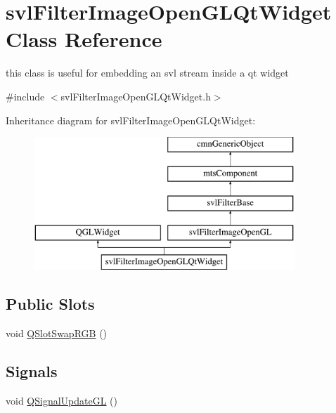 \hypertarget{classsvl_filter_image_open_g_l_qt_widget}{}\section{svl\+Filter\+Image\+Open\+G\+L\+Qt\+Widget Class Reference}
\label{classsvl_filter_image_open_g_l_qt_widget}


this class is useful for embedding an svl stream inside a qt widget  




{\ttfamily \#include $<$svl\+Filter\+Image\+Open\+G\+L\+Qt\+Widget.\+h$>$}

Inheritance diagram for svl\+Filter\+Image\+Open\+G\+L\+Qt\+Widget\+:\begin{figure}[H]
\begin{center}
\leavevmode
\includegraphics[height=5.000000cm]{d2/d20/classsvl_filter_image_open_g_l_qt_widget}
\end{center}
\end{figure}
\subsection*{Public Slots}
\begin{DoxyCompactItemize}
\item 
void \hyperlink{classsvl_filter_image_open_g_l_qt_widget_a8e92a0c6cc87fb73b435189c93a67d75}{Q\+Slot\+Swap\+R\+G\+B} ()
\end{DoxyCompactItemize}
\subsection*{Signals}
\begin{DoxyCompactItemize}
\item 
void \hyperlink{classsvl_filter_image_open_g_l_qt_widget_a8076cdeebadc488a9fe8e1db5e410168}{Q\+Signal\+Update\+G\+L} ()
\end{DoxyCompactItemize}
